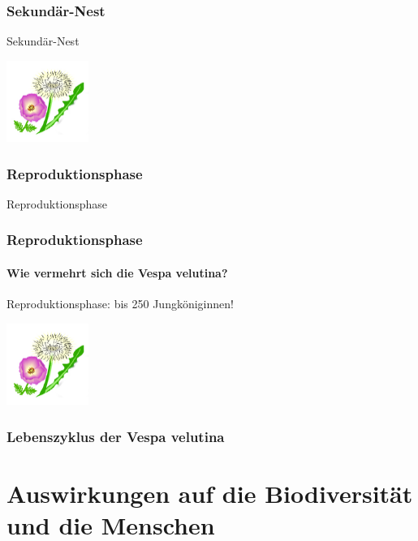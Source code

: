 \documentclass[aspectratio=169]{beamer}
\begin{document}
\subsubsection[Sekundär-Nest]{Sekundär-Nest}


			\begin{frame}{Sekundär-Nest}
				\begin{center}	
					\includegraphics[width=0.2\textwidth]{figures/BH-Logo_Quat.png}
				\end{center}
		
				\end{frame}


\subsubsection[Reproduktionsphase]{Reproduktionsphase}

\begin{frame}{Reproduktionsphase}
\frametitle{Reproduktionsphase} 
\framesubtitle{Wie vermehrt sich die Vespa velutina?}

\begin{examples}{Reproduktionsphase:  }{bis 250 Jungköniginnen!}
\begin{center}	
    \includegraphics[width=0.2\textwidth]{figures/BH-Logo_Quat.png}
\end{center}
\end{examples}
\end{frame}

\subsubsection{Lebenszyklus der Vespa velutina}
\section{Auswirkungen auf die Biodiversität und die Menschen}
\end{document}
